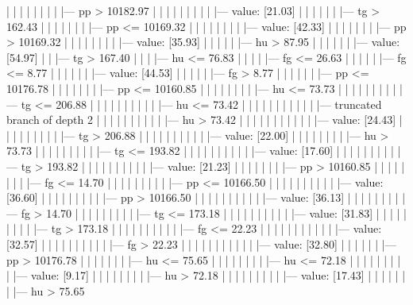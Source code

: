 \documentclass[UTF8, a4paper]{ctexart}
\begin{document}
|   |   |   |   |   |   |   |   |--- pp >  10182.97
|   |   |   |   |   |   |   |   |   |--- value: [21.03]
|   |   |   |   |   |   |--- tg >  162.43
|   |   |   |   |   |   |   |--- pp <= 10169.32
|   |   |   |   |   |   |   |   |--- value: [42.33]
|   |   |   |   |   |   |   |--- pp >  10169.32
|   |   |   |   |   |   |   |   |--- value: [35.93]
|   |   |   |   |   |--- hu >  87.95
|   |   |   |   |   |   |--- value: [54.97]
|   |   |--- tg >  167.40
|   |   |   |--- hu <= 76.83
|   |   |   |   |--- fg <= 26.63
|   |   |   |   |   |--- fg <= 8.77
|   |   |   |   |   |   |--- value: [44.53]
|   |   |   |   |   |--- fg >  8.77
|   |   |   |   |   |   |--- pp <= 10176.78
|   |   |   |   |   |   |   |--- pp <= 10160.85
|   |   |   |   |   |   |   |   |--- hu <= 73.73
|   |   |   |   |   |   |   |   |   |--- tg <= 206.88
|   |   |   |   |   |   |   |   |   |   |--- hu <= 73.42
|   |   |   |   |   |   |   |   |   |   |   |--- truncated branch of depth 2
|   |   |   |   |   |   |   |   |   |   |--- hu >  73.42
|   |   |   |   |   |   |   |   |   |   |   |--- value: [24.43]
|   |   |   |   |   |   |   |   |   |--- tg >  206.88
|   |   |   |   |   |   |   |   |   |   |--- value: [22.00]
|   |   |   |   |   |   |   |   |--- hu >  73.73
|   |   |   |   |   |   |   |   |   |--- tg <= 193.82
|   |   |   |   |   |   |   |   |   |   |--- value: [17.60]
|   |   |   |   |   |   |   |   |   |--- tg >  193.82
|   |   |   |   |   |   |   |   |   |   |--- value: [21.23]
|   |   |   |   |   |   |   |--- pp >  10160.85
|   |   |   |   |   |   |   |   |--- fg <= 14.70
|   |   |   |   |   |   |   |   |   |--- pp <= 10166.50
|   |   |   |   |   |   |   |   |   |   |--- value: [36.60]
|   |   |   |   |   |   |   |   |   |--- pp >  10166.50
|   |   |   |   |   |   |   |   |   |   |--- value: [36.13]
|   |   |   |   |   |   |   |   |--- fg >  14.70
|   |   |   |   |   |   |   |   |   |--- tg <= 173.18
|   |   |   |   |   |   |   |   |   |   |--- value: [31.83]
|   |   |   |   |   |   |   |   |   |--- tg >  173.18
|   |   |   |   |   |   |   |   |   |   |--- fg <= 22.23
|   |   |   |   |   |   |   |   |   |   |   |--- value: [32.57]
|   |   |   |   |   |   |   |   |   |   |--- fg >  22.23
|   |   |   |   |   |   |   |   |   |   |   |--- value: [32.80]
|   |   |   |   |   |   |--- pp >  10176.78
|   |   |   |   |   |   |   |--- hu <= 75.65
|   |   |   |   |   |   |   |   |--- hu <= 72.18
|   |   |   |   |   |   |   |   |   |--- value: [9.17]
|   |   |   |   |   |   |   |   |--- hu >  72.18
|   |   |   |   |   |   |   |   |   |--- value: [17.43]
|   |   |   |   |   |   |   |--- hu >  75.65
\end{document}
